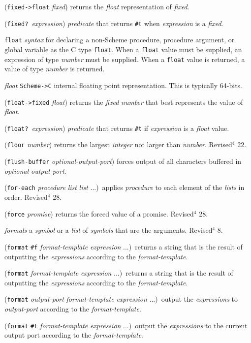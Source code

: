 \documentclass[10pt,twocolumn]{article}
\begin{document}
(\texttt{fixed->float} \emph{fixed}) returns the \emph{float} representation of
\emph{fixed}.

(\texttt{fixed?}\ \emph{expression}) \emph{predicate} that returns \texttt{\#t} when
\emph{expression} is a \emph{fixed}.

\texttt{float} \emph{syntax} for declaring a non-Scheme procedure, procedure
argument, or global variable as the C type \texttt{float}. When a
\texttt{float} value must be supplied, an expression of type \emph{number}
must be supplied.  When a \texttt{float} value is returned, a value of
type \emph{number} is returned.

\emph{float} \texttt{Scheme->C} internal floating point representation.  This is
typically 64-bits.

(\texttt{float->fixed} \emph{float}) returns the \emph{fixed} \emph{number}
that best represents the value of \emph{float}.

(\texttt{float?}\ \emph{expression}) \emph{predicate} that returns \texttt{\#t}
if \emph{expression} is a \emph{float} value.

(\texttt{floor} \emph{number}) returns the largest \emph{integer} not larger than
\emph{number}.  Revised$^4$ 22.

(\texttt{flush-buffer} \emph{optional-output-port}) forces output of all
characters buffered in \emph{optional-output-port}.

(\texttt{for-each} \emph{procedure} \emph{list} \emph{list} ...)\ applies
\emph{procedure} to each element of the \emph{lists} in order.
Revised$^4$ 28.

(\texttt{force} \emph{promise}) returns the forced value of a promise.
Revised$^4$ 28.

\emph{formals} a \emph{symbol} or a \emph{list} of \emph{symbols} that are the
arguments.  Revised$^4$ 8.

(\texttt{format} \texttt{\#f} \emph{format-template} \emph{expression} ...)\ returns a
string that is the result of outputting the \emph{expressions}
according to the \emph{format-template}.

(\texttt{format} \emph{format-template} \emph{expression} ...)\ returns a string
that is the result of outputting the \emph{expressions} according to
the \emph{format-template}.

(\texttt{format} \emph{output-port} \emph{format-template} \emph{expression} ...)\
output the \emph{expressions} to \emph{output-port} according to the
\emph{format-template}.

(\texttt{format} \texttt{\#t} \emph{format-template} \emph{expression} ...)\ output the
\emph{expressions} to the current output port according to the
\emph{format-template}.
\end{document}
